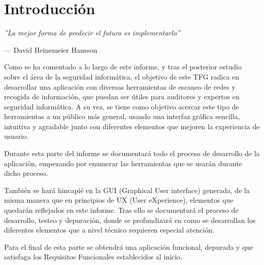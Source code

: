 \chapter{Introducción}

\epigraph{\textit{''La mejor forma de predecir el futuro es implementarlo''}}{--- David Heinemeier Hansson}

Como se ha comentado a lo largo de este informe, y tras el posterior estudio sobre el área de la seguridad informática, el objetivo de este TFG radica en desarrollar una aplicación con diversas herramientas de escaneo de redes y recogida de información, que puedan ser útiles para auditores y expertos en seguridad informática. A su vez, se tiene como objetivo acercar este tipo de herramientas a un público más general, usando una interfaz gráfica sencilla, intuitiva y agradable junto con diferentes elementos que mejoren la experiencia de usuario.

Durante esta parte del informe se documentará todo el proceso de desarrollo de la aplicación, empezando por enumerar las herramientas que se usarán durante dicho proceso.

También se hará hincapié en la GUI (Graphical User interface) generada, de la misma manera que en principios de UX (User eXperience), elementos que quedarán reflejados en este informe. Tras ello se documentará el proceso de desarrollo, testeo y depuración, donde se profundizará en como se desarrollan los diferentes elementos que a nivel técnico requieren especial atención.

Para el final de esta parte se obtendrá una aplicación funcional, depurada y que satisfaga los Requisitos Funcionales establecidos al inicio.

